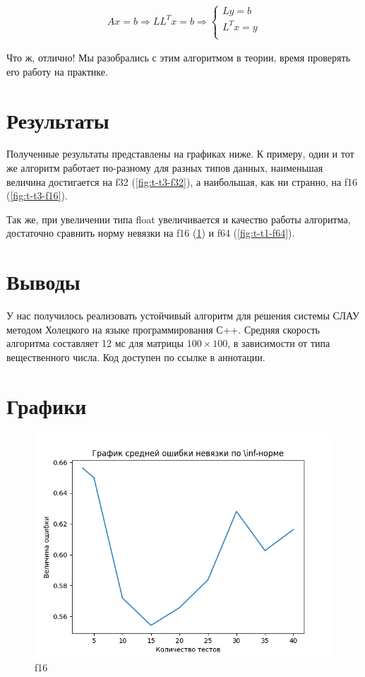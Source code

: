 \documentclass[12pt]{article}
\begin{document}
	\begin{align}
	A x = b \Longrightarrow L L^T x = b \Longrightarrow  
	\begin{cases}
		L y = b \\
		L^T x = y \\
	\end{cases}
	\end{align}
	
	Что ж, отлично! Мы разобрались с этим алгоритмом в теории, время проверять его работу на практике.
	

	
	\section{Результаты}
	Полученные результаты представлены на графиках ниже. К примеру, один и тот же алгоритм работает по-разному для разных типов данных, наименьшая величина достигается на f32 (\ref{fig:t-t3-f32}), а наибольшая, как ни странно, на f16 (\ref{fig:t-t3-f16}).
	
	Так же, при увеличении типа float увеличивается и качество работы алгоритма, достаточно сравнить норму невязки на f16 (\ref{fig:t-t1-f16}) и f64 (\ref{fig:t-t1-f64}).
	
	\section{Выводы}
	У нас получилось реализовать устойчивый алгоритм для решения системы СЛАУ методом Холецкого на языке программирования С++. Средняя скорость алгоритма составляет 12 мс для матрицы $100 \times 100$, в зависимости от типа вещественного числа. Код доступен по ссылке в аннотации.
	
	\section{Графики}
	
	\begin{figure}[h]
		\centering
		\includegraphics[width=16cm]{"../plots/plot-total-t1-f16.png"}
		\caption{f16}
		\label{fig:t-t1-f16}
	\end{figure}
\end{document}
